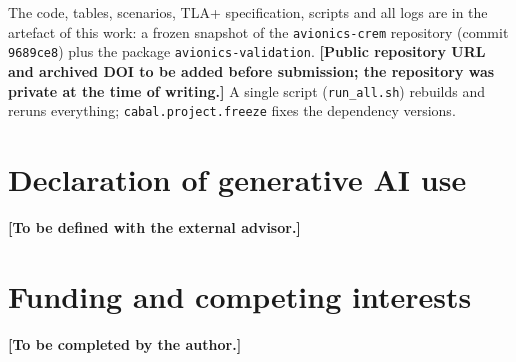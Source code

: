 \documentclass[review]{jfp-epi}
\begin{document}
The code, tables, scenarios, TLA+ specification, scripts and all logs are in the artefact of this work: a frozen snapshot of the \texttt{avionics-crem} repository (commit \texttt{9689ce8}) plus the package \texttt{avionics-validation}. \textbf{[Public repository URL and archived DOI to be added before submission; the repository was private at the time of writing.]} A single script (\texttt{run\_all.sh}) rebuilds and reruns everything; \texttt{cabal.project.freeze} fixes the dependency versions.

\section*{Declaration of generative AI use}

\textbf{[To be defined with the external advisor.]}

\section*{Funding and competing interests}

\textbf{[To be completed by the author.]}



\end{document}
